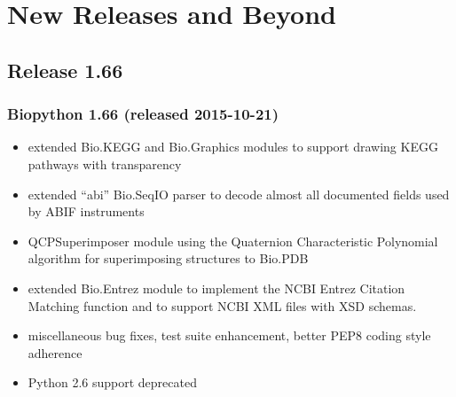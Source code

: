 \documentclass[trans]{beamer}
\begin{document}

\section{New Releases and Beyond}
\subsection*{Release 1.66}
\frame
{
  \frametitle{Biopython 1.66 (released 2015-10-21)}

  \begin{itemize}
  \item extended Bio.KEGG and Bio.Graphics modules to support drawing KEGG pathways with transparency
  \item extended ``abi'' Bio.SeqIO parser to decode almost all documented fields used by ABIF instruments
  \item QCPSuperimposer module using the Quaternion Characteristic Polynomial algorithm for superimposing structures to Bio.PDB
  \item extended Bio.Entrez module to implement the NCBI Entrez Citation Matching function and to support NCBI XML files with XSD schemas.
  \item miscellaneous bug fixes, test suite enhancement, better PEP8 coding style adherence
  \item Python 2.6 support deprecated
  \end{itemize}
}
\frame
\end{document}
